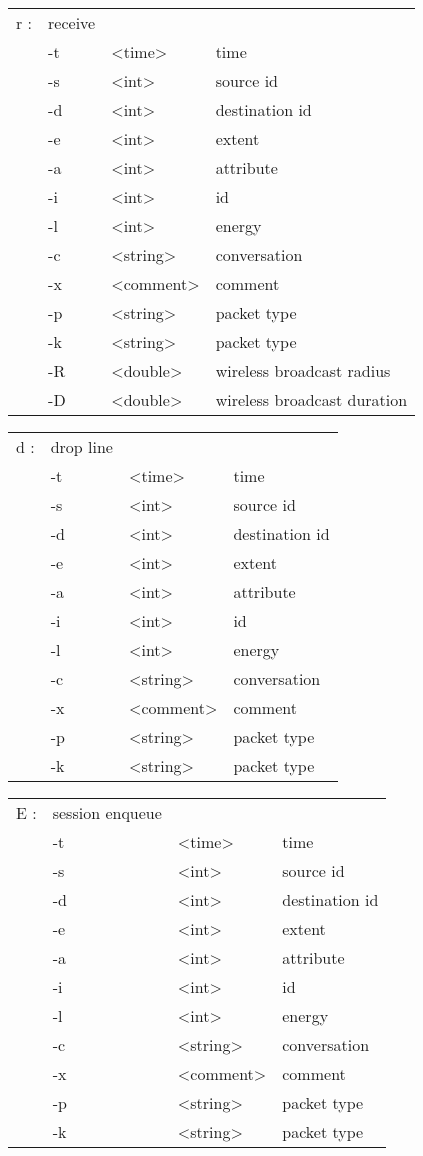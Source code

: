   \begin{tabular}{llll}
  r : & receive & & \\
    &  -t & <time> & time \\
    &  -s & <int> & source id \\
    &  -d & <int> & destination id \\
    &  -e & <int> & extent \\
    &  -a & <int> & attribute \\
    &  -i & <int> & id \\
    &  -l & <int> & energy \\
    &  -c & <string> & conversation \\
    &  -x & <comment> & comment \\
    &  -p & <string> & packet type \\
    &  -k & <string> & packet type \\
    &  -R & <double> & wireless broadcast radius \\
    &  -D & <double> & wireless broadcast duration \\
  \end{tabular}

  \begin{tabular}{llll}
  d : & drop line & & \\
    &  -t & <time> & time \\
    &  -s & <int> & source id \\
    &  -d & <int> & destination id \\
    &  -e & <int> & extent \\
    &  -a & <int> & attribute \\
    &  -i & <int> & id \\
    &  -l & <int> & energy \\
    &  -c & <string> & conversation \\
    &  -x & <comment> & comment \\
    &  -p & <string> & packet type \\
    &  -k & <string> & packet type \\
  \end{tabular}

  \begin{tabular}{llll}
  E : & session enqueue & & \\
    &  -t & <time> & time \\
    &  -s & <int> & source id \\
    &  -d & <int> & destination id \\
    &  -e & <int> & extent \\
    &  -a & <int> & attribute \\
    &  -i & <int> & id \\
    &  -l & <int> & energy \\
    &  -c & <string> & conversation \\
    &  -x & <comment> & comment \\
    &  -p & <string> & packet type \\
    &  -k & <string> & packet type \\
  \end{tabular}

